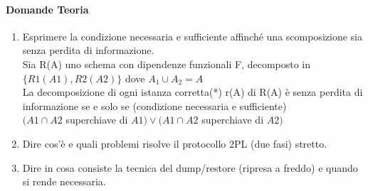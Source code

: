 \documentclass[12pt]{article}
\begin{document}
\paragraph{Domande Teoria}
\begin{enumerate}
    \item Esprimere la condizione necessaria e sufficiente affinché una scomposizione sia senza perdita di informazione. \\
    Sia R(A) uno schema con dipendenze funzionali F, decomposto in $\{R1(A1), R2(A2)\}$ dove $A_1 \cup A_2 = A$ \\
    La decomposizione di ogni istanza corretta(*) r(A) di  R(A) è senza perdita di informazione se e solo se  (condizione necessaria e sufficiente) \\  
    $(A1\cap A2$ superchiave di $A1)\vee(A1 \cap A2 $ superchiave di $A2) $
    \item Dire cos’è e quali problemi risolve il protocollo 2PL (due fasi) stretto. 
    \item Dire in cosa consiste la tecnica del dump/restore (ripresa a freddo) e quando si rende necessaria. 
\end{enumerate}
\end{document}
